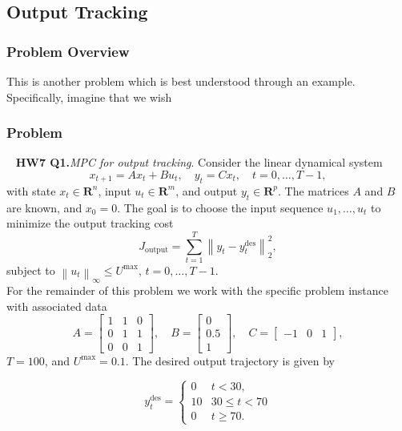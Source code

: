 \documentclass[12pt,reqno]{article}
\theoremstyle{definition}
\numberwithin{equation}{section}
\begin{document}
\subsection{Output Tracking}

\subsubsection*{Problem Overview}
This is another problem which is best understood through an example. Specifically,
imagine that we wish 

\subsubsection*{Problem}

\noindent~\cite{EE364b} \textbf{HW7 Q1.}\textit{MPC for output tracking}.  Consider the linear dynamical system
    \[x_{t+1} = Ax_t + Bu_t, \quad y_t = Cx_t, \quad t = 0, \ldots, T-1,\]
    with state $x_t \in \mathbf{R}^n$, input $u_t \in \mathbf{R}^m$, and output $y_t \in \mathbf{R}^p$.
    The matrices $A$ and $B$ are known, and $x_0=0$. The goal is to choose the input sequence $u_1, \ldots, u_t$
    to minimize the output tracking cost
    \[J_{\text{output}} = \sum_{t=1}^{T}\left\lVert y_t - y_t^{\text{des}} \right\rVert_{2}^2,\]
    subject to $\left\lVert u_t \right\rVert_{\infty} \le U^{\text{max}}, \, t=0, \ldots, T-1$. \\
    For the remainder of this problem we work with the specific problem instance with associated data
    \[A = \begin{bmatrix}
        1 & 1 & 0 \\ 0 & 1 & 1 \\ 0 & 0 & 1
    \end{bmatrix}, \quad
    B = \begin{bmatrix}
        0 \\ 0.5 \\ 1
    \end{bmatrix}, \quad
    C = \begin{bmatrix}
        -1 & 0 & 1
    \end{bmatrix},\]
    $T=100$, and $U^{\text{max}} = 0.1$. The desired output trajectory is given by

    \[y^{\text{des}}_t = \begin{cases}
        0 & t < 30, \\
        10 & 30 \le t < 70 \\
        0 & t \ge 70.
    \end{cases}\]
\end{document}

